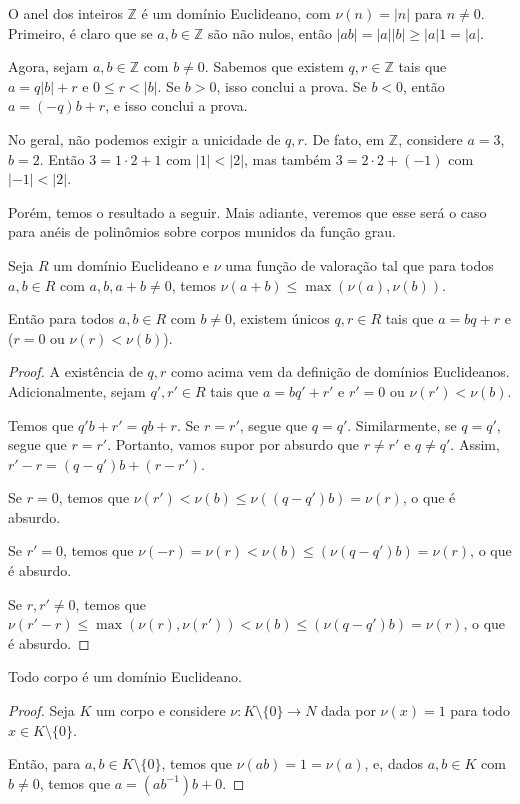 \begin{exemplo}
    O anel dos inteiros $\mathbb Z$ é um domínio Euclideano, com $\nu(n)=|n|$ para $n\neq 0$.
    Primeiro, é claro que se $a, b\in \mathbb Z$ são não nulos, então $|ab|=|a||b|\geq |a|1=|a|$.

    Agora, sejam $a, b\in \mathbb Z$ com $b\neq 0$.
    Sabemos que existem $q, r \in \mathbb Z$ tais que $a=q|b|+r$ e $0\leq r < |b|$.
    Se $b>0$, isso conclui a prova.
    Se $b<0$, então $a=(-q)b+r$, e isso conclui a prova.
\end{exemplo}

\begin{exemplo}
    No geral, não podemos exigir a unicidade de $q, r$.
    De fato, em $\mathbb Z$, considere $a=3$, $b=2$.
    Então $3=1\cdot 2+1$ com $|1|<|2|$, mas também $3=2\cdot 2+(-1)$ com $|-1|<|2|$.
\end{exemplo}

Porém, temos o resultado a seguir.
Mais adiante, veremos que esse será o caso para anéis de polinômios sobre corpos munidos da função grau.


\begin{prop}
    Seja $R$ um domínio Euclideano e $\nu$ uma função de valoração tal que
    para todos $a, b\in R$ com $a, b, a+b\neq 0$, temos $\nu(a+b)\leq \max(\nu(a), \nu(b))$.
    
    Então para todos $a, b \in R$ com $b\neq 0$, existem únicos $q, r \in R$ tais que $a=bq+r$ e ($r=0$ ou $\nu(r)<\nu(b)$).
\end{prop}
\begin{proof}
    A existência de $q, r$ como acima vem da definição de domínios Euclideanos.
    Adicionalmente, sejam $q', r' \in R$ tais que $a=bq'+r'$ e $r'=0$ ou $\nu(r')<\nu(b)$.

    Temos que $q'b+r'=qb+r$.
    Se $r=r'$, segue que $q=q'$.
    Similarmente, se $q=q'$, segue que $r=r'$.
    Portanto, vamos supor por absurdo que $r\neq r'$ e $q\neq q'$.
    Assim, $r'-r=(q-q')b+(r-r')$.
    
    Se $r=0$, temos que $\nu(r')<\nu(b)\leq \nu((q-q')b)=\nu(r)$, o que é absurdo.

    Se $r'=0$, temos que $\nu(-r)=\nu(r)<\nu(b)\leq(\nu(q-q')b)=\nu(r)$, o que é absurdo.
    
    Se $r, r'\neq 0$, temos que $\nu(r'-r)\leq \max(\nu(r), \nu(r'))<\nu(b)\leq(\nu(q-q')b)=\nu(r)$, o que é absurdo.
\end{proof}

\begin{prop}
    Todo corpo é um domínio Euclideano.
\end{prop}
\begin{proof}
Seja $K$ um corpo e considere $\nu:K\setminus \{0\}\to N$ dada por $\nu(x)=1$ para todo $x\in K\setminus \{0\}$.

    Então, para $a, b \in K\setminus \{0\}$, temos que $\nu(ab)=1=\nu(a)$,
    e, dados $a, b\in K$ com $b\neq 0$, temos que $a=(ab^{-1})b+0$.
\end{proof}

